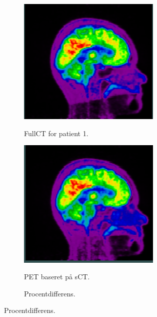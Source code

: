 \begin{figure}
    \centering
    \begin{subfigure}[b]{0.3\textwidth}
        \caption{FullCT for patient 1.}
        \includegraphics[width=0.75\textwidth]{colager/loocv_pet/loocv_010476_pet_ct.png}
        \label{col:loocv_pet_pat1_ct}
    \end{subfigure}\hfill
    \begin{subfigure}[b]{0.3\textwidth}
        \caption{PET baseret på sCT.}
        \includegraphics[width=0.75\textwidth]{colager/loocv_pet/loocv_010476_pet_sct.png}
        \label{col:loocv_pet_pat1_sct}
    \end{subfigure}\hfill
    \begin{subfigure}[b]{0.3\textwidth}
        \caption{Procentdifferens.}

\end{subfigure}
\end{figure}
